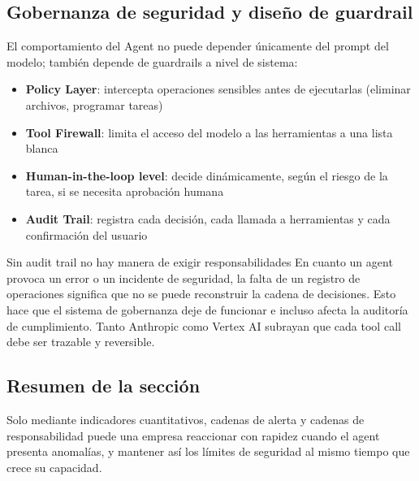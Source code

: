 \subsection{Gobernanza de seguridad y diseño de guardrail}

El comportamiento del Agent no puede depender únicamente del prompt del modelo; también depende de guardrails a nivel de sistema:

\begin{itemize}
    \item \textbf{Policy Layer}: intercepta operaciones sensibles antes de ejecutarlas (eliminar archivos, programar tareas)
    \item \textbf{Tool Firewall}: limita el acceso del modelo a las herramientas a una lista blanca
    \item \textbf{Human-in-the-loop level}: decide dinámicamente, según el riesgo de la tarea, si se necesita aprobación humana
    \item \textbf{Audit Trail}: registra cada decisión, cada llamada a herramientas y cada confirmación del usuario
\end{itemize}

\begin{warningbox}{Sin audit trail no hay manera de exigir responsabilidades}
En cuanto un agent provoca un error o un incidente de seguridad, la falta de un registro de operaciones significa que no se puede reconstruir la cadena de decisiones. Esto hace que el sistema de gobernanza deje de funcionar e incluso afecta la auditoría de cumplimiento. Tanto Anthropic como Vertex AI subrayan que cada tool call debe ser trazable y reversible.
\end{warningbox}

\subsection{Resumen de la sección}

Solo mediante indicadores cuantitativos, cadenas de alerta y cadenas de responsabilidad puede una empresa reaccionar con rapidez cuando el agent presenta anomalías, y mantener así los límites de seguridad al mismo tiempo que crece su capacidad.

